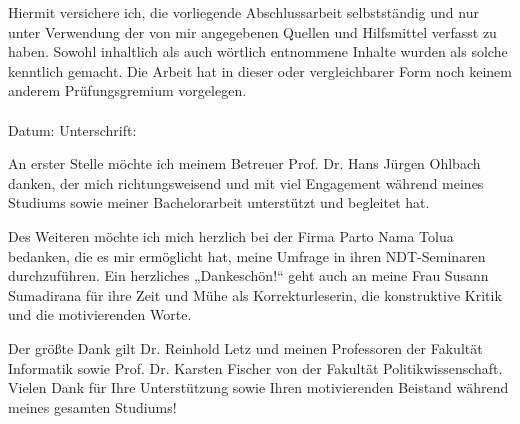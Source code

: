 \label{erklaerung}

Hiermit versichere ich, die vorliegende Abschlussarbeit selbstständig und nur unter Verwendung der von mir angegebenen Quellen und Hilfsmittel verfasst zu haben. Sowohl inhaltlich als auch wörtlich entnommene Inhalte wurden als solche kenntlich gemacht. Die Arbeit hat in dieser oder vergleichbarer Form noch keinem anderem Prüfungsgremium vorgelegen. \\
\\[1.5cm]
Datum:	\hrulefill\enspace Unterschrift: \hrulefill
\\[3.5cm]

\newpage
{}
\label{danksagungen}

An erster Stelle möchte ich meinem Betreuer Prof. Dr. Hans Jürgen Ohlbach danken, der mich richtungsweisend und mit viel Engagement während meines Studiums sowie meiner Bachelorarbeit unterstützt und begleitet hat.

Des Weiteren möchte ich mich herzlich bei der Firma Parto Nama Tolua bedanken, die es mir ermöglicht hat, meine Umfrage in ihren NDT-Seminaren durchzuführen.
Ein herzliches „Dankeschön!“ geht auch an meine Frau Susann Sumadirana für ihre Zeit und Mühe als Korrekturleserin, die konstruktive Kritik und die motivierenden Worte.

Der größte Dank gilt Dr. Reinhold Letz und meinen Professoren der Fakultät Informatik sowie Prof. Dr. Karsten Fischer von der Fakultät Politikwissenschaft.
Vielen Dank für Ihre Unterstützung sowie Ihren motivierenden Beistand während meines gesamten Studiums!

